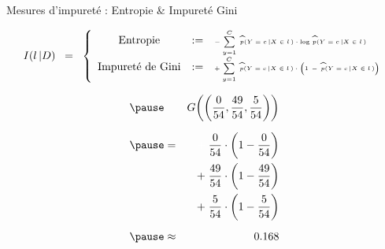 
\begin{frame}{\vskip -0.2cm \Large Mesures d'impuret\'e : Entropie \& Impuret\'e Gini}

\vskip -0.2cm
\tiny
\begin{equation*}
I(l\,\vert D)
\;\; = \;\;
\left\{\begin{array}{ccl}
\textnormal{Entropie}
& := &
	\textnormal{\tiny$-\;\overset{C}{\underset{y=1}{\sum}}\;\,
	\widehat{p}(Y=c\,\vert X\in l\,) \cdot \log\,\widehat{p}(Y=c\,\vert X\in l\,)$}
\\
\textnormal{Impuret\'e de Gini}
& := &
	\textnormal{\tiny$+\;\overset{C}{\underset{y=1}{\sum}}\;\,
	\widehat{p}(Y=c\,\vert X\in l\,) \cdot
	\left(\overset{{\color{white}.}}{1}\,-\,\widehat{p}(Y=c\,\vert X\in l\,)\right)$}
\end{array}\right.
\end{equation*}

\begin{multicols}{2}

	\begin{minipage}{4.5cm}
	\begin{flushleft}
	\vskip 0.25cm
	{\scriptsize
	\begin{eqnarray*}
	\pause
	&&
		\textnormal{\normalsize$G\!\left(\left(\frac{0}{54},\frac{49}{54},\frac{5}{54}\right)\right)$}
	\\
	\pause
	& = &
		{\color{white}+} \;\frac{\overset{{\color{white}1}}{0}}{54} \cdot \left( 1 - \frac{0}{54} \right)
	\\
	&&
		+ \;\frac{49}{54} \cdot \left( 1 - \frac{49}{54} \right)
	\\
	&&
		+ \;\frac{5}{54} \cdot \left( 1 - \frac{5}{54} \right)
	\\
	\pause
	& \approx &
		\overset{{\color{white}-}}{\textnormal{\normalsize$0.168$}}
	\end{eqnarray*}
	}
	\end{flushleft}
	\end{minipage}
	
\columnbreak


\end{multicols}
\end{frame}
